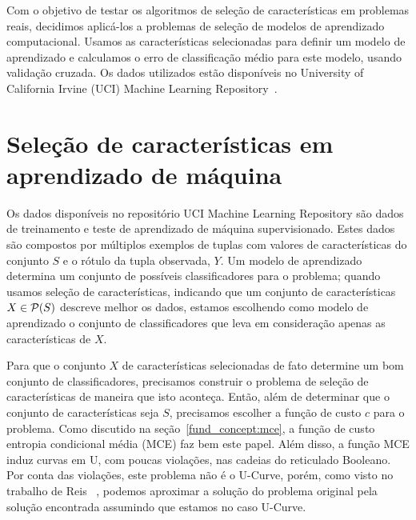 
Com o objetivo de testar os algoritmos de seleção de características
em problemas reais, decidimos aplicá-los a problemas de seleção de 
modelos de aprendizado computacional. Usamos as características 
selecionadas para definir um modelo de aprendizado e calculamos o erro
de classificação médio para este modelo, usando validação cruzada. Os
dados utilizados estão disponíveis no 
University of California Irvine (UCI) Machine Learning 
Repository~\cite{Lic13}.

\section{Seleção de características em aprendizado de máquina}
Os dados disponíveis no repositório UCI Machine Learning Repository
são dados de treinamento e teste de aprendizado de máquina 
supervisionado. Estes dados são compostos por múltiplos exemplos de 
tuplas com valores de características do conjunto $S$ e o rótulo da 
tupla observada, $Y$. Um modelo de aprendizado determina um conjunto de 
possíveis classificadores para o problema; quando usamos seleção de 
características, indicando que um conjunto de características 
$X \in \mathcal{P}(S)$ descreve melhor os dados, estamos escolhendo como 
modelo de aprendizado o conjunto de classificadores que leva em 
consideração apenas as características de $X$.

Para que o conjunto $X$ de características selecionadas de fato 
determine um bom conjunto de classificadores, precisamos construir
o problema de seleção de características de maneira que isto aconteça.
Então, além de determinar que o conjunto de características seja $S$,
precisamos escolher a função de custo $c$ para o problema. 
Como discutido na seção~\ref{fund_concept:mce}, a função de custo
entropia condicional média (MCE) faz bem este papel. Além disso, a 
função MCE induz curvas em U, com poucas violações, nas cadeias do 
reticulado Booleano. Por conta das violações, este problema não é o
U-Curve, porém, como visto no trabalho de Reis ~\cite{Rei12}, podemos 
aproximar a solução do problema original pela solução encontrada 
assumindo que estamos no caso U-Curve.

